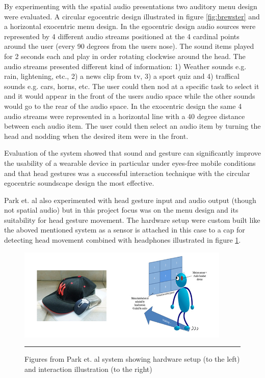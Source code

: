 By experimenting with the spatial audio presentations two auditory menu design were evaluated. A circular egocentric design illustrated in figure \ref{fig:brewster} and a horizontal exocentric menu design. In the egocentric design audio sources were represented by 4 different audio streams positioned at the 4 cardinal points around the user (every 90 degrees from the users nose). The sound items played for 2 seconds each and play in order rotating clockwise around the head. The audio streams presented different kind of information: 1) Weather sounds e.g. rain, lightening, etc., 2) a news clip from tv, 3) a sport quiz and 4) traffical sounds e.g. cars, horns, etc. The user could then nod at a specific task to select it and it would appear in the front of the users audio space while the other sounds would go to the rear of the audio space. In the exocentric design the same 4 audio streams were represented in a horizontal line with a 40 degree distance between each audio item. The user could then select an audio item by turning the head and nodding when the desired item were in the front.

Evaluation of the system showed that sound and gesture can significantly improve the usability of a wearable device in particular under eyes-free mobile conditions and that head gestures was a successful interaction technique with the circular egocentric soundscape design the most effective.

Park et. al \cite{park_gaze-directed_2011} also experimented with head gesture input and audio output (though not spatial audio) but in this project focus was on the menu design and its suitability for head gesture movement. The hardware setup were custom built like the aboved mentioned system as a sensor is attached in this case to a cap for detecting head movement combined with headphones illustrated in figure \ref{fig:park}.

\begin{figure}[t]
	\centering
		\includegraphics[width=0.9\textwidth,height=\textheight,keepaspectratio]{./Figures/park-system.png}
		\rule{35em}{0.5pt}
	\caption[Park system]{Figures from Park et. al \cite{park_gaze-directed_2011} system showing hardware setup (to the left) and interaction illustration (to the right)}
	\label{fig:park}
\end{figure}

